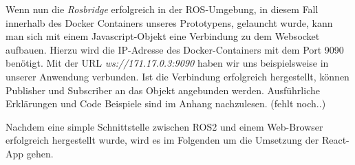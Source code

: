 \begin{flushleft}
\begin{lstlisting}[language=html]
\end{lstlisting}

Wenn nun die \textit{Rosbridge} erfolgreich in der ROS-Umgebung, in diesem Fall innerhalb des Docker Containers unseres Prototypens, gelauncht wurde, kann man sich mit einem Javascript-Objekt eine Verbindung zu dem Websocket aufbauen. Hierzu wird die IP-Adresse des Docker-Containers mit dem Port 9090 benötigt. Mit der URL \textit{ws://171.17.0.3:9090} haben wir uns beispielsweise in unserer Anwendung verbunden. Ist die Verbindung erfolgreich hergestellt, können Publisher und Subscriber an das Objekt angebunden werden. Ausführliche Erklärungen und Code Beispiele sind im Anhang nachzulesen. (fehlt noch..)

Nachdem eine simple Schnittstelle zwischen ROS2 und einem Web-Browser erfolgreich hergestellt wurde, wird es im Folgenden um die Umsetzung der React-App gehen. 




\end{flushleft}